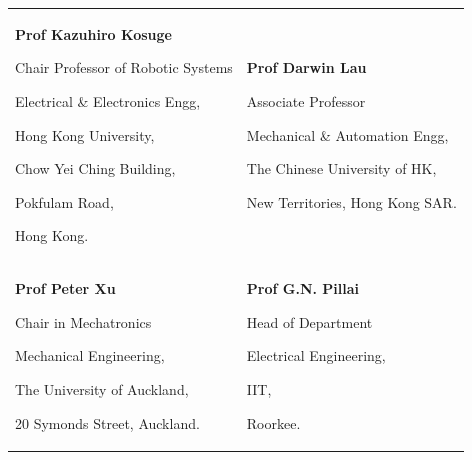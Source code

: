 
\begin{tabularx}{\textwidth}{@{}X X@{}}
\textbf{Prof Kazuhiro Kosuge}\par
Chair Professor of Robotic Systems\par
Electrical \& Electronics Engg,\par
Hong Kong University,\par
Chow Yei Ching Building,\par
Pokfulam Road,\par
Hong Kong.\par
\makefield{\faEnvelope}{\url{kosuge@eee.hku.hk}}
&
\textbf{Prof Darwin Lau}\par
Associate Professor\par
Mechanical \& Automation Engg,\par
The Chinese University of HK,\par 
New Territories, Hong Kong SAR.\par
\makefield{\faEnvelope}{\url{darwinlau@cuhk.edu.hk}}
\\
\textbf{Prof Peter Xu}\par
Chair in Mechatronics\par
Mechanical Engineering,\par
The University of Auckland,\par 
20 Symonds Street, Auckland.\par 
\makefield{\faEnvelope}{\url{p.xu@auckland.ac.nz}}
&
\textbf{Prof G.N. Pillai}\par
Head of Department\par
Electrical Engineering,\par
IIT,\par 
Roorkee.\par
\makefield{\faEnvelope}{\url{gn.pillai@ee.iitr.ac.in}}
\\
\end{tabularx}